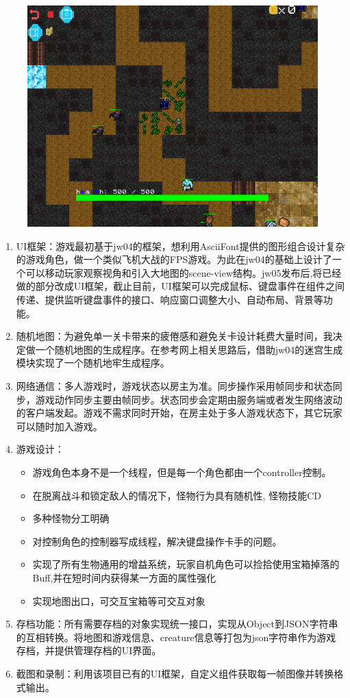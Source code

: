 \documentclass{SCIS2022cn}
\begin{document}
	\begin{figure}[!t]
		\centering
		\includegraphics{img/preview.png}
		\label{preview}
	\end{figure}
\begin{enumerate}
	\item UI框架：游戏最初基于jw04的框架，想利用AsciiFont提供的图形组合设计复杂的游戏角色，做一个类似飞机大战的FPS游戏。为此在jw04的基础上设计了一个可以移动玩家观察视角和引入大地图的scene-view结构。jw05发布后,将已经做的部分改成UI框架，截止目前，UI框架可以完成鼠标、键盘事件在组件之间传递、提供监听键盘事件的接口、响应窗口调整大小、自动布局、背景等功能。
	\item 随机地图：为避免单一关卡带来的疲倦感和避免关卡设计耗费大量时间，我决定做一个随机地图的生成程序。在参考网上相关思路后，借助jw04的迷宫生成模块实现了一个随机地牢生成程序。
	\item 网络通信：多人游戏时，游戏状态以房主为准。同步操作采用帧同步和状态同步，游戏动作同步主要由帧同步。状态同步会定期由服务端或者发生网络波动的客户端发起。游戏不需求同时开始，在房主处于多人游戏状态下，其它玩家可以随时加入游戏。
	\item 游戏设计：
	\begin{itemize}
		\item 游戏角色本身不是一个线程，但是每一个角色都由一个controller控制。
		\item 在脱离战斗和锁定敌人的情况下，怪物行为具有随机性, 怪物技能CD
		\item 多种怪物分工明确
		\item 对控制角色的控制器写成线程，解决键盘操作卡手的问题。
		\item 实现了所有生物通用的增益系统，玩家自机角色可以捡拾使用宝箱掉落的Buff,并在短时间内获得某一方面的属性强化
		\item 实现地图出口，可交互宝箱等可交互对象
	\end{itemize}
	\item 存档功能：所有需要存档的对象实现统一接口，实现从Object到JSON字符串的互相转换。将地图和游戏信息、creature信息等打包为json字符串作为游戏存档，并提供管理存档的UI界面。
	\item 截图和录制：利用该项目已有的UI框架，自定义组件获取每一帧图像并转换格式输出。
\end{enumerate}
\end{document}
